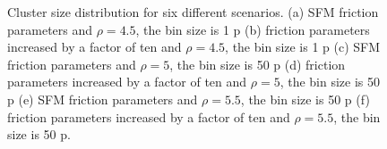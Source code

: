 \begin{figure}[!htbp]
\caption[width=0.47\columnwidth]{Cluster size distribution for six different scenarios. (a) SFM friction parameters and $\rho=4.5$, the bin size is 1 p (b) friction parameters increased by a factor of ten and $\rho=4.5$, the bin size is 1 p (c) SFM friction parameters and $\rho=5$, the bin size is 50 p (d) friction parameters increased by a factor of ten and $\rho=5$, the bin size is 50 p (e) SFM friction parameters and $\rho=5.5$, the bin size is 50 p (f) friction parameters increased by a factor of ten and $\rho=5.5$, the bin size is 50 p.}
\label{cluster_distribution}
\end{figure}






